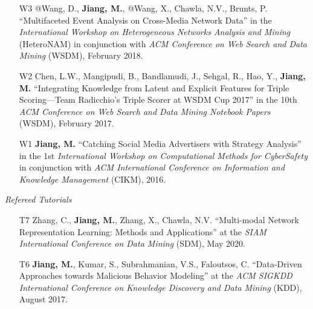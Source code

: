 \documentclass[10pt]{article}
\newenvironment{myindentpar}[1]%
{\begin{list}{}%
         {\setlength{\leftmargin}{#1}}%
         \item[]%
}
{\end{list}}
\newcounter{list}
\newcommand{\hide}[1]{}
\begin{document}
\begin{myindentpar}{0.00cm}
\begin{enumerate}[leftmargin=.5cm]
\item[W3] @Wang, D., \textbf{Jiang, M.}, @Wang, X., Chawla, N.V., Brunts, P. ``Multifaceted Event Analysis on Cross-Media Network Data'' in the \textit{International Workshop on Heterogeneous Networks Analysis and Mining} (HeteroNAM) in conjunction with \textit{ACM Conference on Web Search and Data Mining} (WSDM), February 2018.

	\hide{\vspace{-0.1cm}\hspace{0.5cm}{\small \emph{I conceived the idea in consultation with Mr. Wang. Mr. Wang designed the study, completed the experiments, and wrote the paper. I edited the paper.}}}

\item[W2] Chen, L.W., Mangipudi, B., Bandlamudi, J., Sehgal, R., Hao, Y., \textbf{Jiang, M.} ``Integrating Knowledge from Latent and Explicit Features for Triple Scoring—Team Radicchio's Triple Scorer at WSDM Cup 2017'' in the 10th \textit{ACM Conference on Web Search and Data Mining Notebook Papers} (WSDM), February 2017.

	\hide{\vspace{-0.1cm}\hspace{0.5cm}{\small \emph{I joined the discussion and edited the paper.}}}

\item[W1] \textbf{Jiang, M.} ``Catching Social Media Advertisers with Strategy Analysis'' in the 1st \textit{International Workshop on Computational Methods for CyberSafety} in conjunction with \textit{ACM International Conference on Information and Knowledge Management} (CIKM), 2016.

\end{enumerate}

\hspace{-0.25cm}\emph{Refereed Tutorials}

\begin{enumerate}[leftmargin=.5cm]

\item[T7] Zhang, C., \textbf{Jiang, M.}, Zhang, X., Chawla, N.V. ``Multi-modal Network Representation Learning: Methods and Applications'' at the \textit{SIAM International Conference on Data Mining} (SDM), May 2020.

\item[T6] \textbf{Jiang, M.}, Kumar, S., Subrahmanian, V.S., Faloutsos, C. ``Data-Driven Approaches towards Malicious Behavior Modeling'' at the \textit{ACM SIGKDD International Conference on Knowledge Discovery and Data Mining} (KDD), August 2017.


\end{enumerate}
\end{myindentpar}
\end{document}
